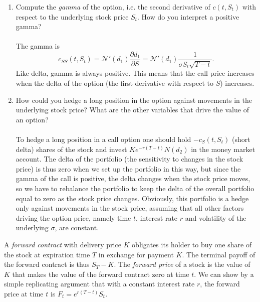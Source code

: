 \documentclass[11pt,a4,table]{article}
\begin{document}
\begin{enumerate}
\begin{enumerate}
        \item Compute the \textit{gamma} of the option, i.e. the second derivative of $c(t,S_t)$ with respect to the underlying stock price $S_t$. How do you interpret a positive gamma?\\\\
        The gamma is
        \begin{equation*}
            c_{SS}(t,S_t) = \mathcal{N}'(d_1)\frac{\partial d_1}{\partial S} =\mathcal{N}'(d_1) \frac{1}{\sigma S_t\sqrt{T-t}}.
        \end{equation*}
        Like delta, gamma is always positive. This means that the call price increases when the delta of the option (the first derivative with respect to $S$) increases.
        
        \item How could you hedge a long position in the option against movements in the underlying stock price? What are the other variables that drive the value of an option?\\\\
        To hedge a long position in a call option one should hold $-c_S(t,S_t)$ (short delta) shares of the stock and invest $Ke^{-r(T-t)}N(d_2)$ in the money market account. The delta of the portfolio (the sensitivity to changes in the stock price) is thus zero when we set up the portfolio in this way, but since the gamma of the call is positive, the delta changes when the stock price moves, so we have to rebalance the portfolio to keep the delta of the overall portfolio equal to zero as the stock price changes. Obviously, this portfolio is a hedge only against movements in the stock price, assuming that all other factors driving the option price, namely time $t$, interest rate $r$ and volatility of the underlying $\sigma$, are constant.
    \end{enumerate}
    
    A \textit{forward contract} with delivery price $K$ obligates its holder to buy one share of the stock at expiration time $T$ in exchange for payment $K$. The terminal payoff of the forward contract is thus $S_T - K$. The \textit{forward price} of a stock is the value of $K$ that makes the value of the forward contract zero at time $t$. We can show by a simple replicating argument that with a constant interest rate $r$, the forward price at time $t$ is $F_t=e^{r(T-t)}S_t$.
    \begin{enumerate}
        \setcounter{enumii}{4}
    

\end{enumerate}
\end{enumerate}
\end{document}
